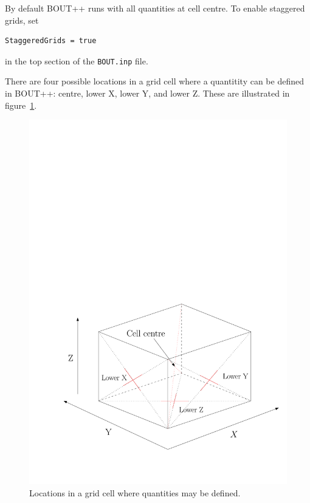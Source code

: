 \documentclass[12pt]{article}
\begin{document}
By default BOUT++ runs with all quantities at cell centre. To enable staggered grids,
set
\begin{verbatim}
StaggeredGrids = true
\end{verbatim}
in the top section of the \texttt{BOUT.inp} file.

There are four possible locations in a grid cell where a quantitity can be defined in BOUT++:
centre, lower X, lower Y, and lower Z. These are illustrated in figure~\ref{fig:stagLocations}.
\begin{figure}[htbp!]
\centering
\includegraphics[width=0.4\paperwidth, keepaspectratio]{figs/stagLocations.pdf}
\caption{Locations in a grid cell where quantities may be defined.}
\label{fig:stagLocations}
\end{figure}
\end{document}
